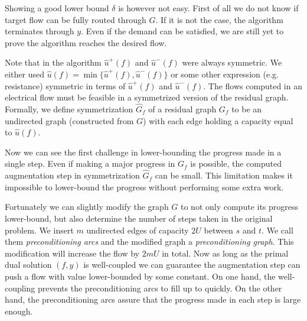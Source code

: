 Showing a good lower bound $\delta$ is however not easy. First of all we do not know if target flow can be fully routed through $G$. If it is not the case, the algorithm terminates through $y$. Even if the demand can be satisfied, we are still yet to prove the algorithm reaches the desired flow.

Note that in the algorithm $\hat u^+(f)$ and $\hat u^-(f)$ were always symmetric. We either used $\hat u(f)=\min\{\hat u^+(f), \hat u^-(f)\}$ or some other expression (e.g. resistance) symmetric in terms of $\hat u^+(f)$ and $\hat u^-(f)$. The flows computed in an electrical flow must be feasible in a symmetrized version of the residual graph.\\
Formally, we define symmetrization $\hat G_f$ of a residual graph $G_f$ to be an undirected graph (constructed from $G$) with each edge holding a capacity equal to $\hat u(f)$.

Now we can see the first challenge in lower-bounding the progress made in a single step. Even if making a major progress in $G_f$ is possible, the computed augmentation step in symmetrization $\hat G_f$ can be small. This limitation makes it impossible to lower-bound the progress without performing some extra work.

Fortunately we can slightly modify the graph $G$ to not only compute its progress lower-bound, but also determine the number of steps taken in the original problem.
We insert $m$ undirected edges of capacity $2U$ between $s$ and $t$.
We call them \textit{preconditioning arcs} and the modified graph a \textit{preconditioning graph}.
This modification will increase the flow by $2mU$ in total.
Now as long as the primal dual solution $(f,y)$ is well-coupled we can guarantee the augmentation step can push a flow with value lower-bounded by some constant.
On one hand, the well-coupling prevents the preconditioning arcs to fill up to quickly. On the other hand, the preconditioning arcs assure that the progress made in each step is large enough.

